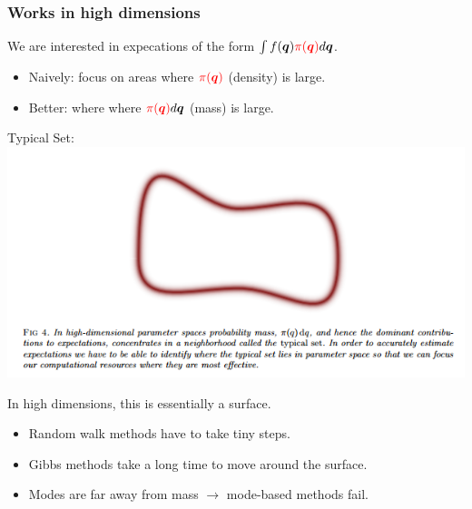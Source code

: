 \documentclass[xcolor=dvipsnames]{beamer}
\begin{document}
\begin{frame}
\frametitle{Works in high dimensions}
We are interested in expecations of the form $\int f(\bm{q}){\color{red}\pi(\bm{q})}d\bm{q}$.
\begin{itemize}
\item Naively: focus on areas where ${\color{red}\pi(\bm{q})}$ (density) is large.
\item Better: where where ${\color{red}\pi(\bm{q})}d\bm{q}$ (mass) is large.
\end{itemize}
\begin{center}
Typical Set:\\
\includegraphics[height=0.4\textheight]{typicalset.png}
\end{center}
In high dimensions, this is essentially a surface.
\begin{itemize}
\item Random walk methods have to take tiny steps.
\item Gibbs methods take a long time to move around the surface.
\item Modes are far away from mass $\to$ mode-based methods fail.
\end{itemize}
\end{frame}
\end{document}

